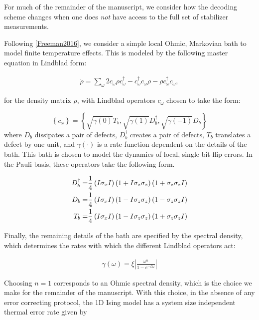 \documentclass[twocolumn,superscriptaddress,aps,prb,floatfix]{revtex4-1}
\begin{document}
For much of the remainder of the manuscript, we consider how the decoding scheme changes when one does \emph{not} have access to the full set of stabilizer measurements.

Following \ref{Freeman2016}, we consider a simple local Ohmic, Markovian bath to model finite temperature effects.  This is modeled by the following master equation in Lindblad form:

\begin{align}
\dot{\rho }=\sum_{\omega }{2c_{\omega }\rho c^{\dagger }_\omega}-c^{\dagger }_{\omega }c_{\omega }\rho -\rho c^{\dagger }_{\omega }c_{\omega }, \label{eq:Lindblad}
\end{align}

for the density matrix $\rho$, with Lindblad operators $c_{\omega }$ chosen to take the form:

\begin{equation}
\left \{ c_\omega \right \} = \left \{ \sqrt{\gamma(0)} T_{b}, \sqrt{\gamma(1)} D^\dagger_{b}, \sqrt{\gamma(-1)} D_{b} \right\} 
\end{equation}
where $D_{b}$ dissipates a pair of defects,  $D^\dagger_{b}$ creates a pair of defects, $T_{b}$ translates a defect by one unit, and $\gamma(\cdot)$ is a rate function dependent on the details of the bath.  This bath is chosen to model the dynamics of local, single bit-flip errors.  In the Pauli basis, these operators take the following form.

\begin{align}
D^\dagger_{b}= &\frac{1}{4} \left(I \sigma_x I \right)\left(1+I \sigma_z \sigma_z\right)\left(1+ \sigma_z \sigma_z I\right) \notag \\
D_{b}= &\frac{1}{4} \left(I \sigma_x I \right)\left(1-I \sigma_z \sigma_z\right)\left(1-\sigma_z \sigma_z I\right) \notag \\
T_{b}= &\frac{1}{4} \left(I \sigma_x I \right)\left(1-I \sigma_z \sigma_z\right)\left(1+ \sigma_z \sigma_z I\right) \label{eq:LindbladDef}
\end{align}

Finally, the remaining details of the bath are specified by the spectral density, which determines the rates with which the different Lindblad operators act:

\begin{align}
\gamma \left( \omega \right)=\xi \left  \vert \frac{\omega^n }{1-e^{-\beta \omega }} \right \vert \label{eq:gammadef}
\end{align}

Choosing $n=1$ corresponds to an Ohmic spectral density, which is the choice we make for the remainder of the manuscript.  With this choice, in the absence of any error correcting protocol, the 1D Ising model has a system size independent thermal error rate given by\cite{Freeman2016}
\end{document}
